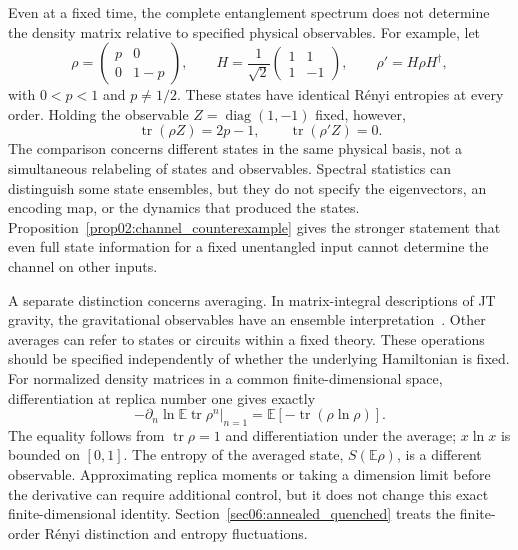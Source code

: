 \documentclass[11pt,letterpaper]{article}
\theoremstyle{plain}
\theoremstyle{definition}
\theoremstyle{remark}
\newcommand{\E}{\mathbb{E}}
\DeclareMathOperator{\tr}{tr}
\DeclareMathOperator{\diag}{diag}
\begin{document}
Even at a fixed time, the complete entanglement spectrum does not
determine the density matrix relative to specified physical
observables. For example, let
\begin{equation}
 \rho=\begin{pmatrix}p&0\\0&1-p\end{pmatrix},\qquad
 H=\frac1{\sqrt2}\begin{pmatrix}1&1\\1&-1\end{pmatrix},\qquad
 \rho'=H\rho H^\dagger,
 \label{eq02:isospectral_states}
\end{equation}
with $0<p<1$ and $p\ne1/2$. These states have identical R\'enyi
entropies at every order. Holding the observable
$Z=\diag(1,-1)$ fixed, however,
\begin{equation}
 \tr(\rho Z)=2p-1,
 \qquad \tr(\rho' Z)=0.
 \label{eq02:isospectral_observable}
\end{equation}
The comparison concerns different states in the same physical basis,
not a simultaneous relabeling of states and observables. Spectral
statistics can distinguish some state ensembles, but they do not
specify the eigenvectors, an encoding map, or the dynamics that
produced the states. Proposition~\ref{prop02:channel_counterexample}
gives the stronger statement that even full state information for a
fixed unentangled input cannot determine the channel on other inputs.

A separate distinction concerns averaging. In matrix-integral
descriptions of JT gravity, the gravitational observables have an
ensemble interpretation~\citep{saadetal2019,marolfmaxfield2020}.
Other averages can refer to states or circuits within a fixed theory.
These operations should be specified independently of whether the
underlying Hamiltonian is fixed. For normalized density matrices in
a common finite-dimensional space, differentiation at replica number
one gives exactly
\begin{equation}
 -\left.\partial_n\ln\E\tr\rho^n\right|_{n=1}
 =\E[-\tr(\rho\ln\rho)].
 \label{eq02:replica_derivative}
\end{equation}
The equality follows from $\tr\rho=1$ and differentiation under the
average; $x\ln x$ is bounded on $[0,1]$. The entropy of the averaged
state, $S(\E\rho)$, is a different observable. Approximating replica
moments or taking a dimension limit before the derivative can require
additional control, but it does not change this exact
finite-dimensional identity. Section~\ref{sec06:annealed_quenched}
treats the finite-order R\'enyi distinction and entropy fluctuations.
\end{document}
